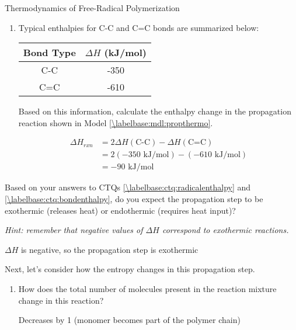 \begin{activity}{Thermodynamics of Free-Radical Polymerization}
\begin{ctqs}
\begin{enumerate}
			\item Typical enthalpies for C-C and C=C bonds are summarized below:
				
				\begin{center}
					\renewcommand{\arraystretch}{1.5}
					\begin{tabular}{c c}
						\hline
						Bond Type & $\Delta H$ (kJ/mol) \\\hline
						C-C	&	-350 \\
						C=C &	-610 \\\hline
					\end{tabular}
				\end{center}
				
				Based on this information, calculate the enthalpy change in the propagation reaction shown in Model \ref{\labelbase:mdl:propthermo}.
				
				\begin{solution}[1.25in]
					\begin{align*}
						\Delta H_{rxn} &= 2\Delta H(\text{C-C}) - \Delta H (\text{C=C})\\
							&= 2(-350\text{ kJ/mol}) - (-610\text{ kJ/mol})\\
							&= -90\text{ kJ/mol}
					\end{align*}
				\end{solution}
		\end{enumerate}
		
	\question Based on your answers to CTQs \ref{\labelbase:ctq:radicalenthalpy} and \ref{\labelbase:ctq:bondenthalpy}, do you expect the propagation step to be exothermic (releases heat) or endothermic (requires heat input)?
	
		\emph{Hint: remember that negative values of $\Delta H$ correspond to exothermic reactions.}
				
				\begin{solution}[0.75in]
					$\Delta H$ is negative, so the propagation step is exothermic
				\end{solution}
		
	\question Next, let's consider how the entropy changes in this propagation step.
	
		\begin{enumerate}
			
			\item How does the total number of molecules present in the reaction mixture change in this reaction?
				
				\begin{solution}[0.5in]
					Decreases by 1 (monomer becomes part of the polymer chain)
				\end{solution}
			

\end{enumerate}
\end{ctqs}
\end{activity}
